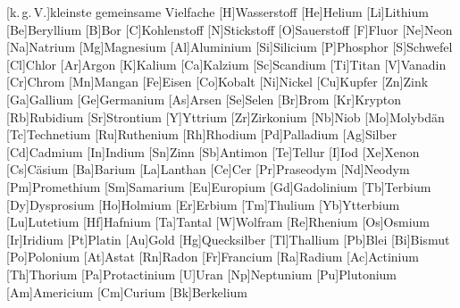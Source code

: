 [k.\,g.\,V.]{kleinste gemeinsame Vielfache}%
[H]{Wasserstoff}%
[He]{Helium}%
[Li]{Lithium}%
[Be]{Beryllium}%
[B]{Bor}%
[C]{Kohlenstoff}%
[N]{Stickstoff}%
[O]{Sauerstoff}%
[F]{Fluor}%
[Ne]{Neon}%
[Na]{Natrium}%
[Mg]{Magnesium}%
[Al]{Aluminium}%
[Si]{Silicium}%
[P]{Phosphor}%
[S]{Schwefel}%
[Cl]{Chlor}%
[Ar]{Argon}%
[K]{Kalium}%
[Ca]{Kalzium}%
[Sc]{Scandium}%
[Ti]{Titan}%
[V]{Vanadin}%
[Cr]{Chrom}%
[Mn]{Mangan}%
[Fe]{Eisen}%
[Co]{Kobalt}%
[Ni]{Nickel}%
[Cu]{Kupfer}%
[Zn]{Zink}%
[Ga]{Gallium}%
[Ge]{Germanium}%
[As]{Arsen}%
[Se]{Selen}%
[Br]{Brom}%
[Kr]{Krypton}%
[Rb]{Rubidium}%
[Sr]{Strontium}%
[Y]{Yttrium}%
[Zr]{Zirkonium}%
[Nb]{Niob}%
[Mo]{Molybd\"an}%
[Tc]{Technetium}%
[Ru]{Ruthenium}%
[Rh]{Rhodium}%
[Pd]{Palladium}%
[Ag]{Silber}%
[Cd]{Cadmium}%
[In]{Indium}%
[Sn]{Zinn}%
[Sb]{Antimon}%
[Te]{Tellur}%
[I]{Iod}%
[Xe]{Xenon}%
[Cs]{C\"asium}%
[Ba]{Barium}%
[La]{Lanthan}%
[Ce]{Cer}%
[Pr]{Praseodym}%
[Nd]{Neodym}%
[Pm]{Promethium}%
[Sm]{Samarium}%
[Eu]{Europium}%
[Gd]{Gadolinium}%
[Tb]{Terbium}%
[Dy]{Dysprosium}%
[Ho]{Holmium}%
[Er]{Erbium}%
[Tm]{Thulium}%
[Yb]{Ytterbium}%
[Lu]{Lutetium}%
[Hf]{Hafnium}%
[Ta]{Tantal}%
[W]{Wolfram}%
[Re]{Rhenium}%
[Os]{Osmium}%
[Ir]{Iridium}%
[Pt]{Platin}%
[Au]{Gold}%
[Hg]{Quecksilber}%
[Tl]{Thallium}%
[Pb]{Blei}%
[Bi]{Bismut}%
[Po]{Polonium}%
[At]{Astat}%
[Rn]{Radon}%
[Fr]{Francium}%
[Ra]{Radium}%
[Ac]{Actinium}%
[Th]{Thorium}%
[Pa]{Protactinium}%
[U]{Uran}%
[Np]{Neptunium}%
[Pu]{Plutonium}%
[Am]{Americium}%
[Cm]{Curium}%
[Bk]{Berkelium}%
